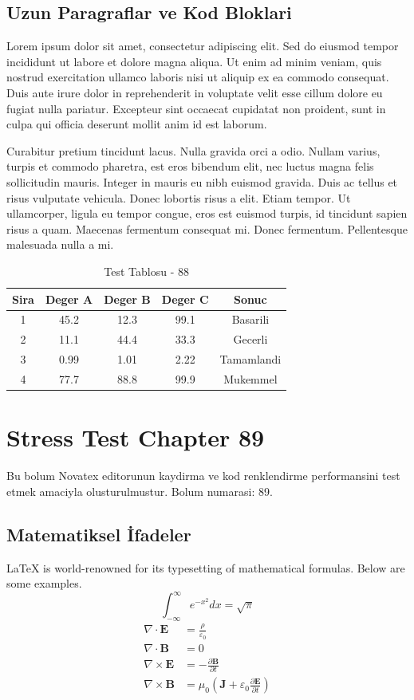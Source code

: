 \documentclass[12pt,a4paper]{article}
\begin{document}
\subsection{Uzun Paragraflar ve Kod Bloklari}
Lorem ipsum dolor sit amet, consectetur adipiscing elit. Sed do eiusmod tempor incididunt ut labore et dolore magna aliqua. Ut enim ad minim veniam, quis nostrud exercitation ullamco laboris nisi ut aliquip ex ea commodo consequat. Duis aute irure dolor in reprehenderit in voluptate velit esse cillum dolore eu fugiat nulla pariatur. Excepteur sint occaecat cupidatat non proident, sunt in culpa qui officia deserunt mollit anim id est laborum.

Curabitur pretium tincidunt lacus. Nulla gravida orci a odio. Nullam varius, turpis et commodo pharetra, est eros bibendum elit, nec luctus magna felis sollicitudin mauris. Integer in mauris eu nibh euismod gravida. Duis ac tellus et risus vulputate vehicula. Donec lobortis risus a elit. Etiam tempor. Ut ullamcorper, ligula eu tempor congue, eros est euismod turpis, id tincidunt sapien risus a quam. Maecenas fermentum consequat mi. Donec fermentum. Pellentesque malesuada nulla a mi.

\begin{table}[h!]
\centering
\begin{tabular}{|c|c|c|c|c|}
\hline
\textbf{Sira} & \textbf{Deger A} & \textbf{Deger B} & \textbf{Deger C} & \textbf{Sonuc} \\
\hline
1 & 45.2 & 12.3 & 99.1 & Basarili \\
2 & 11.1 & 44.4 & 33.3 & Gecerli \\
3 & 0.99 & 1.01 & 2.22 & Tamamlandi \\
4 & 77.7 & 88.8 & 99.9 & Mukemmel \\
\hline
\end{tabular}
\caption{Test Tablosu - 88}
\end{table}

\newpage
\section{Stress Test Chapter 89}
Bu bolum Novatex editorunun kaydirma ve kod renklendirme performansini test etmek amaciyla olusturulmustur. Bolum numarasi: 89.

\subsection{Matematiksel İfadeler}
\LaTeX{} is world-renowned for its typesetting of mathematical formulas. Below are some examples.
\begin{equation}
\int_{-\infty}^{\infty} e^{-x^2} dx = \sqrt{\pi}
\end{equation}
\begin{align}
\nabla \cdot \mathbf{E} &= \frac{\rho}{\varepsilon_0} \\
\nabla \cdot \mathbf{B} &= 0 \\
\nabla \times \mathbf{E} &= -\frac{\partial \mathbf{B}}{\partial t} \\
\nabla \times \mathbf{B} &= \mu_0\left(\mathbf{J} + \varepsilon_0 \frac{\partial \mathbf{E}}{\partial t}\right)
\end{align}
\end{document}
